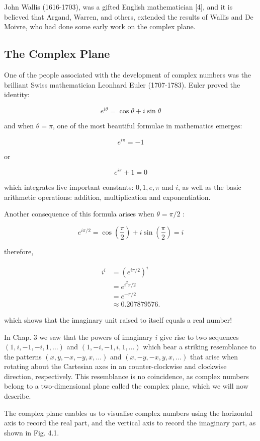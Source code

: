 \documentclass[10pt]{article}
\begin{document}
John Wallis (1616-1703), was a gifted English mathematician [4], and it is believed that Argand, Warren, and others, extended the results of Wallis and De Moivre, who had done some early work on the complex plane.

\subsection{The Complex Plane}
One of the people associated with the development of complex numbers was the brilliant Swiss mathematician Leonhard Euler (1707-1783). Euler proved the identity:

$$
e^{i \theta}=\cos \theta+i \sin \theta
$$

and when $\theta=\pi$, one of the most beautiful formulae in mathematics emerges:

$$
e^{i \pi}=-1
$$

or

$$
e^{i \pi}+1=0
$$

which integrates five important constants: $0,1, e, \pi$ and $i$, as well as the basic arithmetic operations: addition, multiplication and exponentiation.

Another consequence of this formula arises when $\theta=\pi / 2$ :

$$
e^{i \pi / 2}=\cos \left(\frac{\pi}{2}\right)+i \sin \left(\frac{\pi}{2}\right)=i
$$

therefore,

$$
\begin{aligned}
i^{i} & =\left(e^{i \pi / 2}\right)^{i} \\
& =e^{i^{2} \pi / 2} \\
& =e^{-\pi / 2} \\
& \approx 0.207879576 .
\end{aligned}
$$

which shows that the imaginary unit raised to itself equals a real number!

In Chap. 3 we saw that the powers of imaginary $i$ give rise to two sequences $(1, i,-1,-i, 1, \ldots)$ and $(1,-i,-1, i, 1, \ldots)$ which bear a striking resemblance to the patterns $(x, y,-x,-y, x, \ldots)$ and $(x,-y,-x, y, x, \ldots)$ that arise when rotating about the Cartesian axes in an counter-clockwise and clockwise direction, respectively. This resemblance is no coincidence, as complex numbers belong to a two-dimensional plane called the complex plane, which we will now describe.

The complex plane enables us to visualise complex numbers using the horizontal axis to record the real part, and the vertical axis to record the imaginary part, as shown in Fig. 4.1.
\end{document}

